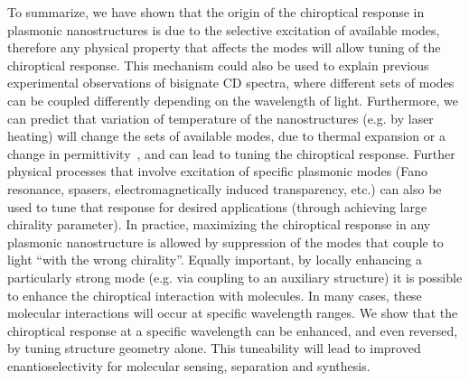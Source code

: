 To summarize, we have shown that the origin of the chiroptical response in plasmonic nanostructures is due to the selective excitation of available modes, therefore any physical property that affects the modes will allow tuning of the chiroptical response. This mechanism could also be used to explain previous experimental observations of bisignate CD spectra, where different sets of modes can be coupled differently depending on the wavelength of light. Furthermore, we can predict that variation of temperature of the nanostructures (e.g. by laser heating) will change the sets of available modes, due to thermal expansion or a change in permittivity~\cite{Aksyutov1977}, and can lead to tuning the chiroptical response. Further physical processes that involve excitation of specific plasmonic modes (Fano resonance, spasers, electromagnetically induced transparency, etc.) can also be used to tune that response for desired applications (through achieving large chirality parameter). 
In practice, maximizing the chiroptical response in any plasmonic nanostructure is allowed by suppression of the modes that couple to light ``with the wrong chirality''. Equally important, by locally enhancing a particularly strong mode (e.g. via coupling to an auxiliary structure) it is possible to enhance the chiroptical interaction with molecules. In many cases, these molecular interactions will occur at specific wavelength ranges. We show that the chiroptical response at a specific wavelength can be enhanced, and even reversed, by tuning structure geometry alone. This tuneability will lead to improved enantioselectivity for molecular sensing, separation and synthesis.
